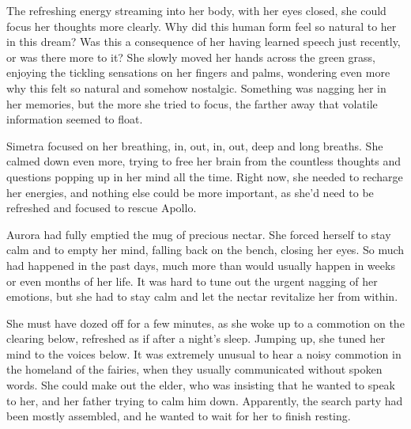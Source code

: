 The refreshing energy streaming into her body, with her eyes closed, she could focus her thoughts more clearly. Why did this human form feel so natural to her in this dream? Was this a consequence of her having learned speech just recently, or was there more to it? She slowly moved her hands across the green grass, enjoying the tickling sensations on her fingers and palms, wondering even more why this felt so natural and somehow nostalgic. Something was nagging her in her memories, but the more she tried to focus, the farther away that volatile information seemed to float.

Simetra focused on her breathing, in, out, in, out, deep and long breaths. She calmed down even more, trying to free her brain from the countless thoughts and questions popping up in her mind all the time. Right now, she needed to recharge her energies, and nothing else could be more important, as she'd need to be refreshed and focused to rescue Apollo.

\fancybreaker{}

Aurora had fully emptied the mug of precious nectar. She forced herself to stay calm and to empty her mind, falling back on the bench, closing her eyes. So much had happened in the past days, much more than would usually happen in weeks or even months of her life. It was hard to tune out the urgent nagging of her emotions, but she had to stay calm and let the nectar revitalize her from within.

She must have dozed off for a few minutes, as she woke up to a commotion on the clearing below, refreshed as if after a night's sleep. Jumping up, she tuned her mind to the voices below. It was extremely unusual to hear a noisy commotion in the homeland of the fairies, when they usually communicated without spoken words. She could make out the elder, who was insisting that he wanted to speak to her, and her father trying to calm him down. Apparently, the search party had been mostly assembled, and he wanted to wait for her to finish resting.

